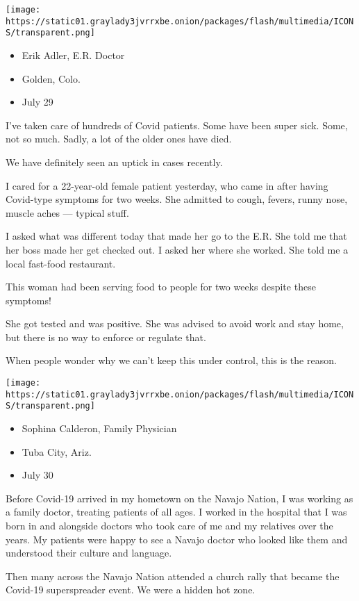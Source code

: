 \texttt{[image: https://static01.graylady3jvrrxbe.onion/packages/flash/multimedia/ICONS/transparent.png]}

\begin{itemize}
\tightlist
\item
  Erik Adler, E.R. Doctor
\item
  Golden, Colo.
\item
  July 29
\end{itemize}

I've taken care of hundreds of Covid patients. Some have been super
sick. Some, not so much. Sadly, a lot of the older ones have died.

We have definitely seen an uptick in cases recently.

I cared for a 22-year-old female patient yesterday, who came in after
having Covid-type symptoms for two weeks. She admitted to cough, fevers,
runny nose, muscle aches --- typical stuff.

I asked what was different today that made her go to the E.R. She told
me that her boss made her get checked out. I asked her where she worked.
She told me a local fast-food restaurant.

This woman had been serving food to people for two weeks despite these
symptoms!

She got tested and was positive. She was advised to avoid work and stay
home, but there is no way to enforce or regulate that.

When people wonder why we can't keep this under control, this is the
reason.

\texttt{[image: https://static01.graylady3jvrrxbe.onion/packages/flash/multimedia/ICONS/transparent.png]}

\begin{itemize}
\tightlist
\item
  Sophina Calderon, Family Physician
\item
  Tuba City, Ariz.
\item
  July 30
\end{itemize}

Before Covid-19 arrived in my hometown on the Navajo Nation, I was
working as a family doctor, treating patients of all ages. I worked in
the hospital that I was born in and alongside doctors who took care of
me and my relatives over the years. My patients were happy to see a
Navajo doctor who looked like them and understood their culture and
language.

Then many across the Navajo Nation attended a church rally that became
the Covid-19 superspreader event. We were a hidden hot zone.

